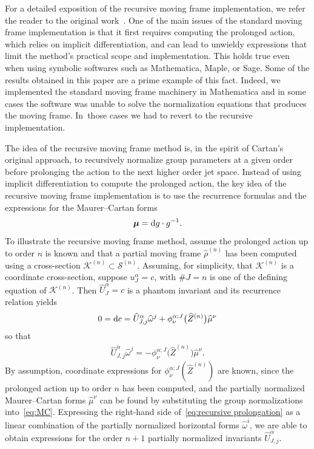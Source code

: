 \documentclass[pdftex]{sigma}%
\numberwithin{equation}{section}
\newcommand{\bmu}{\boldsymbol{\mu}}
\newcommand{\n}{^{(n)}}
\newcommand{\mS}{\mathcal{S}}
\begin{document}
For a detailed exposition of the recursive moving frame implementation, we refer the reader to the original work~\cite{O-2011}. One of the main issues of the standard moving frame implementation is that it first requires computing the prolonged action, which relies on implicit differentiation, and can lead to unwieldy expressions that limit the method's practical scope and implementation. This holds true even when using symbolic softwares such as {\sc Mathematica}, {\sc Maple}, or {\sc Sage}. Some of the results obtained in this paper are a prime example of this fact. Indeed, we implemented the standard moving frame machinery in {\sc Mathematica} and in some cases the software was unable to solve the normalization equations that produces the moving frame. In~those cases we had to revert to the recursive implementation.

The idea of the recursive moving frame method is, in the spirit of Cartan's original approach, to recursively normalize group parameters at a given order before prolonging the action to the next higher order jet space. Instead of using implicit differentiation to compute the prolonged action, the key idea of the recursive moving frame implementation is to use the recurrence formulas and the expressions for the Maurer--Cartan forms
\begin{gather}\label{eq:MC}
\bmu = {\rm d}g \cdot g^{-1}.
\end{gather}
To illustrate the recursive moving frame method, assume the prolonged action up to order $n$ is known and that a partial moving frame $\widehat{\rho}\n$ has been computed using a cross-section $\mathcal{K}\n \subset \mS\n$. Assuming, for simplicity, that $\mathcal{K}\n$ is a coordinate cross-section, suppose $u^\alpha_J=c$, with $\#J=n$ is one of the defining equation of $\mathcal{K}\n$. Then $\widehat{U}^\alpha_J=c$ is a phantom invariant and its recurrence relation yields
\begin{gather*}
0 = {\rm d}c = \widehat{U}^\alpha_{J,j} \widehat{\omega}^j + \phi^{\alpha;J}_\nu\big(\widehat{Z}\n\big)\widehat{\mu}^\nu
\end{gather*}
so that
%
\begin{gather}\label{eq:recursive prolongation}
\widehat{U}^\alpha_{J,j} \widehat{\omega}^j = - \phi^{\alpha;J}_\nu\big(\widehat{Z}\n\big)\widehat{\mu}^\nu.
\end{gather}
%
By assumption, coordinate expressions for $\phi^{\alpha;J}_\nu(\widehat{Z}\n)$ are known, since the prolonged action up to order $n$ has been computed, and the partially normalized Maurer--Cartan forms $\widehat{\mu}^\nu$ can be found by substituting the group normalizations into~\eqref{eq:MC}. Expressing the right-hand side of~\eqref{eq:recursive prolongation} as a linear combination of the partially normalized horizontal forms $\widehat{\omega}^i$, we are able to obtain expressions for the order $n+1$ partially normalized invariants $\widehat{U}^\alpha_{J,j}$.
\end{document}
